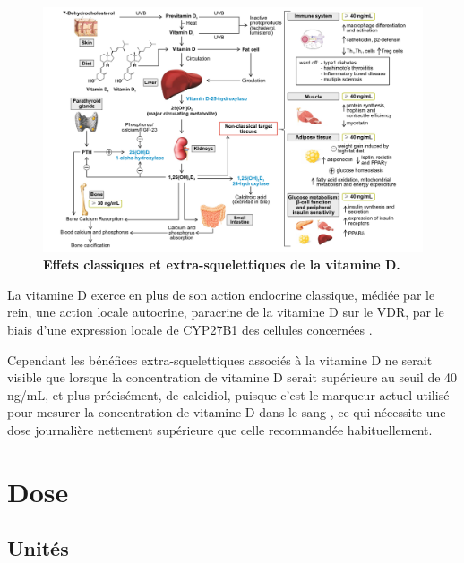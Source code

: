 \documentclass[
  a4paper,
  DIV=11,
  numbers=noendperiod,
  listof=totoc]{scrreprt}
\begin{document}
\begin{figure}

{\centering \includegraphics{figures/extra-skeletal-effect.png}

}

\caption{\label{fig-extra-skeletal}\textbf{Effets classiques et
extra-squelettiques de la vitamine D.} \textcite{Caprio.2017}}

\end{figure}

La vitamine D exerce en plus de son action endocrine classique, médiée
par le rein, une action locale autocrine, paracrine de la vitamine D sur
le VDR, par le biais d'une expression locale de CYP27B1 des cellules
concernées \autocite{Carmeliet.2015,Cannell.2008}.

Cependant les bénéfices extra-squelettiques associés à la vitamine D ne
serait visible que lorsque la concentration de vitamine D serait
supérieure au seuil de 40 ng/mL, et plus précisément, de calcidiol,
puisque c'est le marqueur actuel utilisé pour mesurer la concentration
de vitamine D dans le sang \autocite{Caprio.2017}, ce qui nécessite une
dose journalière nettement supérieure que celle recommandée
habituellement.

\hypertarget{dose}{%
\section{Dose}\label{dose}}

\hypertarget{unituxe9s}{%
\subsection{Unités}\label{unituxe9s}}
\end{document}
